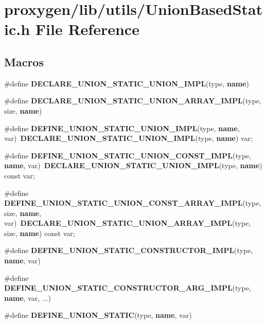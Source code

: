 \section{proxygen/lib/utils/\+Union\+Based\+Static.h File Reference}
\label{UnionBasedStatic_8h}
\subsection*{Macros}
\begin{DoxyCompactItemize}
\item 
\#define {\bf D\+E\+C\+L\+A\+R\+E\+\_\+\+U\+N\+I\+O\+N\+\_\+\+S\+T\+A\+T\+I\+C\+\_\+\+U\+N\+I\+O\+N\+\_\+\+I\+M\+PL}(type,  {\bf name})
\item 
\#define {\bf D\+E\+C\+L\+A\+R\+E\+\_\+\+U\+N\+I\+O\+N\+\_\+\+S\+T\+A\+T\+I\+C\+\_\+\+U\+N\+I\+O\+N\+\_\+\+A\+R\+R\+A\+Y\+\_\+\+I\+M\+PL}(type,  size,  {\bf name})
\item 
\#define {\bf D\+E\+F\+I\+N\+E\+\_\+\+U\+N\+I\+O\+N\+\_\+\+S\+T\+A\+T\+I\+C\+\_\+\+U\+N\+I\+O\+N\+\_\+\+I\+M\+PL}(type,  {\bf name},  var)~{\bf D\+E\+C\+L\+A\+R\+E\+\_\+\+U\+N\+I\+O\+N\+\_\+\+S\+T\+A\+T\+I\+C\+\_\+\+U\+N\+I\+O\+N\+\_\+\+I\+M\+PL}(type, {\bf name}) var;
\item 
\#define {\bf D\+E\+F\+I\+N\+E\+\_\+\+U\+N\+I\+O\+N\+\_\+\+S\+T\+A\+T\+I\+C\+\_\+\+U\+N\+I\+O\+N\+\_\+\+C\+O\+N\+S\+T\+\_\+\+I\+M\+PL}(type,  {\bf name},  var)~{\bf D\+E\+C\+L\+A\+R\+E\+\_\+\+U\+N\+I\+O\+N\+\_\+\+S\+T\+A\+T\+I\+C\+\_\+\+U\+N\+I\+O\+N\+\_\+\+I\+M\+PL}(type, {\bf name}) const var;
\item 
\#define {\bf D\+E\+F\+I\+N\+E\+\_\+\+U\+N\+I\+O\+N\+\_\+\+S\+T\+A\+T\+I\+C\+\_\+\+U\+N\+I\+O\+N\+\_\+\+C\+O\+N\+S\+T\+\_\+\+A\+R\+R\+A\+Y\+\_\+\+I\+M\+PL}(type,  size,  {\bf name},  var)~{\bf D\+E\+C\+L\+A\+R\+E\+\_\+\+U\+N\+I\+O\+N\+\_\+\+S\+T\+A\+T\+I\+C\+\_\+\+U\+N\+I\+O\+N\+\_\+\+A\+R\+R\+A\+Y\+\_\+\+I\+M\+PL}(type, size, {\bf name}) const var;
\item 
\#define {\bf D\+E\+F\+I\+N\+E\+\_\+\+U\+N\+I\+O\+N\+\_\+\+S\+T\+A\+T\+I\+C\+\_\+\+C\+O\+N\+S\+T\+R\+U\+C\+T\+O\+R\+\_\+\+I\+M\+PL}(type,  {\bf name},  var)
\item 
\#define {\bf D\+E\+F\+I\+N\+E\+\_\+\+U\+N\+I\+O\+N\+\_\+\+S\+T\+A\+T\+I\+C\+\_\+\+C\+O\+N\+S\+T\+R\+U\+C\+T\+O\+R\+\_\+\+A\+R\+G\+\_\+\+I\+M\+PL}(type,  {\bf name},  var, ...)
\item 
\#define {\bf D\+E\+F\+I\+N\+E\+\_\+\+U\+N\+I\+O\+N\+\_\+\+S\+T\+A\+T\+IC}(type,  {\bf name},  var)

\end{DoxyCompactItemize}
